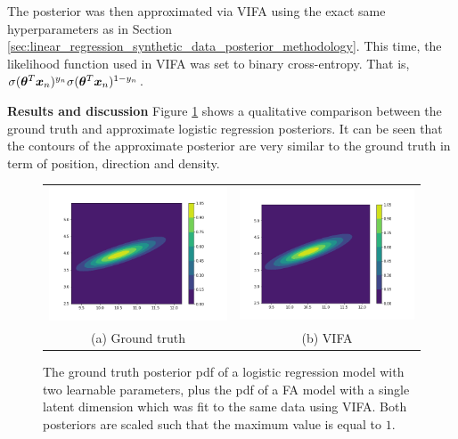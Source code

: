 \documentclass[10pt]{article} %
\begin{document}
The posterior was then approximated via VIFA using the exact same hyperparameters as in Section \ref{sec:linear_regression_synthetic_data_posterior_methodology}. This time, the likelihood function used in VIFA was set to binary cross-entropy. That is, $\sigma({\bm{\theta}}^T {\bm{x}}_n)^{y_n} \sigma({\bm{\theta}}^T {\bm{x}}_n)^{1 - y_n}$.


\textbf{Results and discussion} Figure \ref{fig:logistic_regression_synthetic_data_posterior} shows a qualitative comparison between the ground truth and approximate logistic regression posteriors. It can be seen that the contours of the approximate posterior are very similar to the ground truth in term of position, direction and density.
\begin{figure}[!htbp] 
\begin{center}
\begin{tabular}{cc}
	\includegraphics[width=70mm]{plots/logistic_regression_synthetic_true_posterior.png}
	& \includegraphics[width=70mm]{plots/logistic_regression_synthetic_vifa_posterior.png} \\
	(a) Ground truth
	& (b) VIFA \\[6pt]
\end{tabular}
\end{center}
\caption{The ground truth posterior pdf of a logistic regression model with two learnable parameters, plus the pdf of a FA model with a single latent dimension which was fit to the same data using VIFA. Both posteriors are scaled such that the maximum value is equal to $1$.}
\label{fig:logistic_regression_synthetic_data_posterior}
\end{figure}
\end{document}
